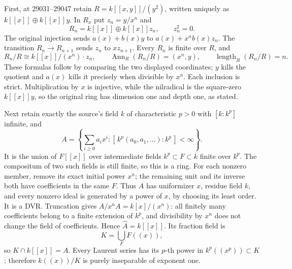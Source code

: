 First, at 29031--29047 retain \(R=k[[x,y]]/(y^2)\), written uniquely as \(k[[x]]\oplus k[[x]]y\). In \(R_x\) put \(z_n=y/x^n\) and \[
 R_n=k[[x]]\oplus k[[x]]z_n,\qquad z_n^2=0.
\] The original injection sends \(a(x)+b(x)y\) to \(a(x)+x^nb(x)z_n\). The transition \(R_n\to R_{n+1}\) sends \(z_n\) to \(xz_{n+1}\). Every \(R_n\) is finite over \(R\), and \[
 R_n/R\cong k[[x]]/(x^n)\cdot z_n,\qquad
 \operatorname{Ann}_R(R_n/R)=(x^n,y),\qquad
 \operatorname{length}_R(R_n/R)=n.
\] These formulas follow by comparing the two displayed coordinates; \(y\) kills the quotient and \(a(x)\) kills it precisely when divisible by \(x^n\). Each inclusion is strict. Multiplication by \(x\) is injective, while the nilradical is the square-zero \(k[[x]]y\), so the original ring has dimension one and depth one, as stated.

Next retain exactly the source's field \(k\) of characteristic \(p>0\) with \([k:k^p]\) infinite, and \[
 A=\left\{\sum_{i\ge0}a_i x^i:
       [\,k^p(a_0,a_1,\ldots):k^p\,]<\infty\right\}.
\] It is the union of \(F[[x]]\) over intermediate fields \(k^p\subset F\subset k\) finite over \(k^p\). The compositum of two such fields is still finite, so this is a ring. For each nonzero member, remove its exact initial power \(x^n\); the remaining unit and its inverse both have coefficients in the same \(F\). Thus \(A\) has uniformizer \(x\), residue field \(k\), and every nonzero ideal is generated by a power of \(x\), by choosing its least order. It is a DVR. Truncation gives \(A/x^nA=k[x]/(x^n)\): all finitely many coefficients belong to a finite extension of \(k^p\), and divisibility by \(x^n\) does not change the field of coefficients. Hence \(\widehat A=k[[x]]\). Its fraction field is \[
 K=\bigcup_F F((x)),
\] so \(K\cap k[[x]]=A\). Every Laurent series has its \(p\)-th power in \(k^p((x^p))\subset K\); therefore \(k((x))/K\) is purely inseparable of exponent one.

